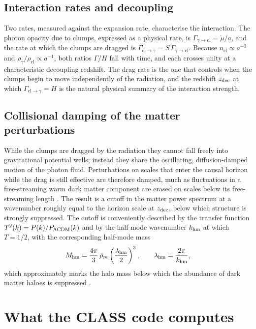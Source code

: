 \documentclass[11pt,a4paper]{article}
\newcommand{\cl}{\mathrm{cl}}
\begin{document}
\subsection{Interaction rates and decoupling}

Two rates, measured against the expansion rate, characterise the interaction. The photon opacity due to clumps, expressed as a physical rate, is $\Gamma_{\gamma\to\cl} = \dot\mu/a$, and the rate at which the clumps are dragged is $\Gamma_{\cl\to\gamma} = S\,\Gamma_{\gamma\to\cl}$. Because $n_\cl\propto a^{-3}$ and $\rho_\gamma/\rho_\cl\propto a^{-1}$, both ratios $\Gamma/H$ fall with time, and each crosses unity at a characteristic decoupling redshift. The drag rate is the one that controls when the clumps begin to move independently of the radiation, and the redshift $z_{\rm dec}$ at which $\Gamma_{\cl\to\gamma} = H$ is the natural physical summary of the interaction strength.

\subsection{Collisional damping of the matter perturbations}

While the clumps are dragged by the radiation they cannot fall freely into gravitational potential wells; instead they share the oscillating, diffusion-damped motion of the photon fluid. Perturbations on scales that enter the causal horizon while the drag is still effective are therefore damped, much as fluctuations in a free-streaming warm dark matter component are erased on scales below its free-streaming length \citep{Boehm2001}. The result is a cutoff in the matter power spectrum at a wavenumber roughly equal to the horizon scale at $z_{\rm dec}$, below which structure is strongly suppressed. The cutoff is conveniently described by the transfer function $T^2(k) = P(k)/P_{\Lambda\rm CDM}(k)$ and by the half-mode wavenumber $k_{\rm hm}$ at which $T = 1/2$, with the corresponding half-mode mass
\begin{equation}
M_{\rm hm} = \frac{4\pi}{3}\,\bar\rho_m\left(\frac{\lambda_{\rm hm}}{2}\right)^3, \qquad \lambda_{\rm hm} = \frac{2\pi}{k_{\rm hm}},
\end{equation}
which approximately marks the halo mass below which the abundance of dark matter haloes is suppressed \citep{Schneider2012}.

\section{What the CLASS code computes}
\label{sec:class}
\end{document}
